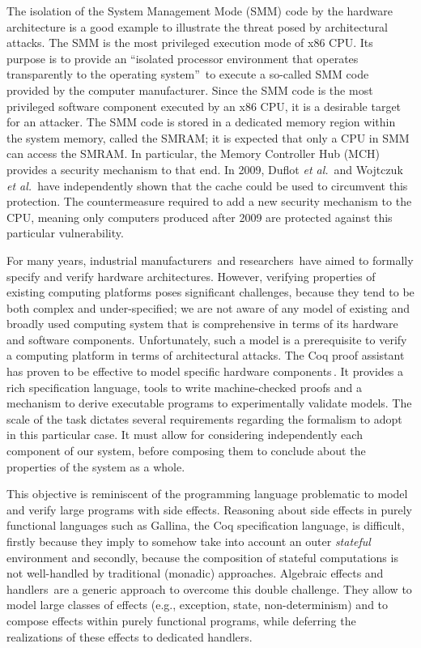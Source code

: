 The isolation of the System Management Mode (SMM) code by the hardware
architecture is a good example to illustrate the threat posed by architectural
attacks.
%
The SMM is the most privileged execution mode of x86 CPU.
%
Its purpose is to provide an ``isolated processor environment that operates
transparently to the operating system''\,\cite{intel2014manual} to execute a
so-called SMM code provided by the computer manufacturer.
%
Since the SMM code is the most privileged software component executed by an x86
CPU, it is a desirable target for an attacker.
%
The SMM code is stored in a dedicated memory region within the system memory,
called the SMRAM; it is expected that only a CPU in SMM can access the SMRAM.
%
In particular, the Memory Controller Hub (MCH)\,\cite{intel2009mch} provides a
security mechanism to that end.
%
In 2009, Duflot \emph{et al.}\,\cite{duflot2009smram} and Wojtczuk \emph{et
  al.}\,\cite{wojtczuk2009smram} have independently shown that the cache could
be used to circumvent this protection.
%
The countermeasure required to add a new security mechanism to the CPU, meaning
only computers produced after 2009 are protected against this particular
vulnerability.

For many years, industrial manufacturers\,\cite{reid2017arm,leslie2015sgx} and
researchers\,\cite{chong2016report,choi2017kami} have aimed to formally specify
and verify hardware architectures.
%
However, verifying properties of existing computing platforms poses significant
challenges, because they tend to be both complex and under-specified; we are not
aware of any model of existing and broadly used computing system that is
comprehensive in terms of its hardware and software components.
%
Unfortunately, such a model is a prerequisite to verify a computing platform in
terms of architectural attacks.
%
The Coq proof assistant\,\cite{coq} has proven to be effective to model specific
hardware
components\,\cite{braibant2011coquet,morrisett2012rocksalt,choi2017kami,jomaa2016mmu}.
%
It provides a rich specification language, tools to write machine-checked proofs
and a mechanism to derive executable programs to experimentally validate models.
%
The scale of the task dictates several requirements regarding the formalism to
adopt in this particular case.
%
It must allow for considering independently each component of our system, before
composing them to conclude about the properties of the system as a whole.

This objective is reminiscent of the programming language problematic to model
and verify large programs with side effects.
%
Reasoning about side effects in purely functional languages such as {\textsc
  Gallina}, the Coq specification language, is difficult, firstly because they
imply to somehow take into account an outer \emph{stateful} environment and
secondly, because the composition of stateful computations is not well-handled
by traditional (monadic) approaches.
%
Algebraic effects and handlers\,\cite{bauer2015effects} are a generic approach
to overcome this double challenge.
%
They allow to model large classes of effects (e.g., exception, state,
non-determinism) and to compose effects within purely functional programs, while
deferring the realizations of these effects to dedicated handlers.

